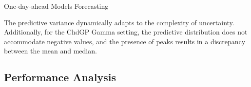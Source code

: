 \begin{frame}{One-day-ahead Models Forecasting}
	\centering
	\begin{figure}[htbp]
		\centering
		\tiny
		\setlength{} 
		\setlength{}
		
		
	\end{figure}
	\vspace{-1.5em}
	\begin{block}{}
		 The predictive variance dynamically adapts to the complexity of uncertainty. Additionally, for the ChdGP Gamma setting, the predictive distribution does not accommodate negative values, and the presence of peaks results in a discrepancy between the mean and median.
	\end{block}
\end{frame}

%		

\subsection{Performance Analysis}

%		

